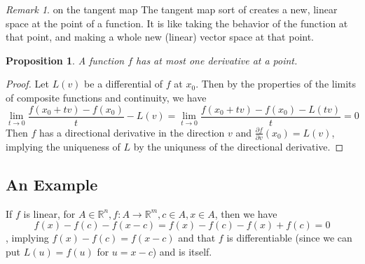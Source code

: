 \documentclass[12pt]{article}
\newcommand{\R}{\mathbb{R}}
\newtheorem{proposition}{Proposition}[theorem]
\theoremstyle{definition}
\theoremstyle{remark}
\newtheorem*{remark}{Remark}
\begin{document}
\begin{remark}{on the tangent map}
The tangent map sort of creates a new, linear space at the point of a function. It is like taking the behavior of the function at that point, and making a whole new (linear) vector space at that point.
\end{remark}

\begin{proposition}
    A function $f$ has at most one derivative at a point.
\end{proposition}
\begin{proof}
    Let $L(v)$ be a differential of $f$ at $x_0$. Then by the properties of the limits of composite functions and continuity, we have 
    $$\lim_{t\to0}\frac{f(x_0+tv)-f(x_0)}{t}-L(v)=\lim_{t\to0}\frac{f(x_0+tv)-f(x_0)-L(tv)}{t}=0$$
    Then $f$ has a directional derivative in the direction $v$ and $\frac{\partial f}{\partial v}(x_0)=L(v)$, implying the uniqueness of $L$ by the uniquness of the directional derivative.
\end{proof}

\subsection{An Example}
If $f$ is linear, for $A\in\R^n, f:A\to\R^m, c\in A, x\in A$, then we have $$f(x)-f(c)-f(x-c)=f(x)-f(c)-f(x)+f(c)=0$$, implying $f(x)-f(c)=f(x-c)$ and that $f$ is differentiable (since we can put $L(u)=f(u)$ for $u=x-c$) and is itself.
\end{document}
